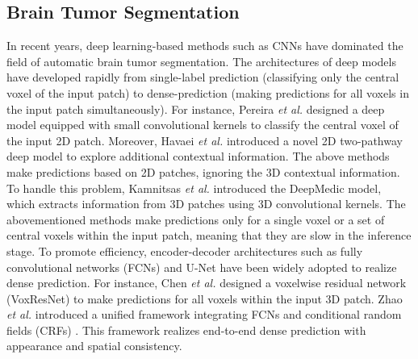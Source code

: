 \documentclass[journal,twoside]{IEEEtran}
\begin{document}
\subsection{Brain Tumor Segmentation} 
In recent years, deep learning-based methods such as CNNs have dominated the field of automatic brain tumor segmentation. The architectures of deep models \cite{long2015fully,ronneberger2015u, pereira2016brain, havaei2017brain,kamnitsas2017efficient, zhao2018deep, chen2018voxresnet, kamnitsas2017ensembles,saha2018her2net,farag2017bottom,myronenko20183d,fehri2019bayesian,xiang2018automatic,zhou2018learning} have developed rapidly from single-label prediction (classifying only the central voxel of the input patch) to dense-prediction (making predictions for all voxels in the input patch simultaneously). For instance, Pereira \emph{et al.} \cite{pereira2016brain} designed a deep model equipped with small convolutional kernels to classify the central voxel of the input 2D patch. Moreover, Havaei \emph{et al.} \cite{havaei2017brain} introduced a novel 2D two-pathway deep model to explore additional contextual information. The above methods make predictions based on 2D patches, ignoring the 3D contextual information. To handle this problem, Kamnitsas \emph{et al.} \cite{kamnitsas2017efficient}
introduced the DeepMedic model, which extracts information from 3D patches using 3D convolutional kernels. The abovementioned methods make predictions only for a single voxel or a set of central voxels within the input patch, meaning that they are slow in the inference stage. To promote efficiency, encoder-decoder architectures such as fully convolutional networks (FCNs) \cite{long2015fully} and U-Net \cite{ronneberger2015u} have been widely adopted to realize dense prediction. For instance, Chen \emph{et al.} \cite{chen2018voxresnet} designed a voxelwise residual network (VoxResNet) to make predictions for all voxels within the input 3D patch. Zhao \emph{et al.} \cite{zhao2018deep} introduced a unified framework integrating FCNs and conditional random fields (CRFs) \cite{krahenbuhl2011efficient}. This framework realizes end-to-end dense prediction with appearance and spatial consistency.
\end{document}
